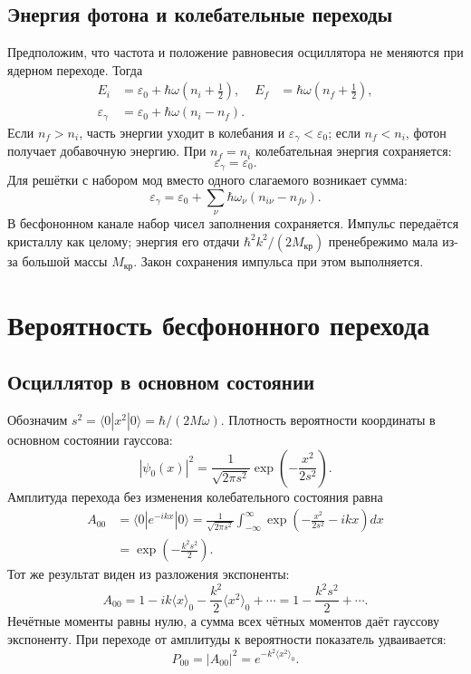 \documentclass[../final.tex]{subfiles}
\begin{document}
\subsection{Энергия фотона и колебательные переходы}
Предположим, что частота и положение равновесия осциллятора не меняются
при ядерном переходе. Тогда
\begin{align*}
 E_i&=\varepsilon_0+\hbar\omega\left(n_i+\frac12\right),
 &E_f&=\hbar\omega\left(n_f+\frac12\right),\\
 \varepsilon_\gamma&=\varepsilon_0+\hbar\omega(n_i-n_f).
\end{align*}
Если $n_f>n_i$, часть энергии уходит в колебания и
$\varepsilon_\gamma<\varepsilon_0$; если $n_f<n_i$, фотон получает
добавочную энергию. При $n_f=n_i$ колебательная энергия сохраняется:
\begin{equation*}
 \boxed{\varepsilon_\gamma=\varepsilon_0.}
\end{equation*}
Для решётки с набором мод вместо одного слагаемого возникает сумма:
\begin{equation*}
 \varepsilon_\gamma=\varepsilon_0+
 \sum_\nu\hbar\omega_\nu(n_{i\nu}-n_{f\nu}).
\end{equation*}
В бесфононном канале набор чисел заполнения сохраняется.
Импульс передаётся кристаллу как целому; энергия его отдачи
$\hbar^2k^2/(2M_{\text{кр}})$ пренебрежимо мала из-за большой массы
$M_{\text{кр}}$. Закон сохранения импульса при этом выполняется.

\clearpage
\section{Вероятность бесфононного перехода}
\subsection{Осциллятор в основном состоянии}
Обозначим $s^2=\langle0|x^2|0\rangle=\hbar/(2M\omega)$.
Плотность вероятности координаты в основном состоянии гауссова:
\begin{equation*}
 |\psi_0(x)|^2=\frac1{\sqrt{2\pi s^2}}
 \exp\!\left(-\frac{x^2}{2s^2}\right).
\end{equation*}
Амплитуда перехода без изменения колебательного состояния равна
\begin{align*}
 A_{00}&=\langle0|e^{-ikx}|0\rangle
 =\frac1{\sqrt{2\pi s^2}}\int_{-\infty}^{\infty}
 \exp\!\left(-\frac{x^2}{2s^2}-ikx\right)dx\\
 &=\exp\!\left(-\frac{k^2s^2}{2}\right).
\end{align*}
Тот же результат виден из разложения экспоненты:
\begin{equation*}
 A_{00}=1-ik\langle x\rangle_0-\frac{k^2}2\langle x^2\rangle_0+\cdots
 =1-\frac{k^2s^2}{2}+\cdots.
\end{equation*}
Нечётные моменты равны нулю, а сумма всех чётных моментов даёт гауссову
экспоненту. При переходе от амплитуды к вероятности показатель удваивается:
\begin{equation*}
 P_{00}=|A_{00}|^2=e^{-k^2\langle x^2\rangle_0}.
\end{equation*}
\end{document}
